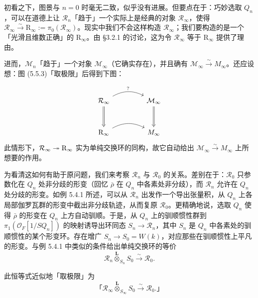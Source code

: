 初看之下，图景与 $n=0$ 时毫无二致，似乎没有进展。但要点在于：巧妙选取 $Q_n$，可以在道德上让 $\mathcal R_n$「趋于」一个实际上是经典的对象 $\mathcal R_\infty$，使得 $\mathcal R_\infty\xrightarrow{\sim}\mathrm R_\infty:=\pi_0(\mathcal R_\infty)$。现实中我们不会这样构造 $\mathcal R_\infty$；我们要构造的是一个「光滑且维数正确」的 $\mathrm R_\infty$。由 §3.2.1 的讨论，这为令 $\mathcal R_\infty$ 等于 $\mathrm R_\infty$ 提供了理由。

进而，$\mathcal M_n$「趋于」一个对象 $\mathcal M_\infty$（它确实存在），并且确有 $\mathcal M_\infty\xrightarrow{\sim}M_\infty$。还应设想：图 (5.5.3)「取极限」后得到下图：


\[
\begin{tikzcd}[column sep=4.5em, row sep=3em]
\mathcal R_\infty \arrow[r, bend left=28, "?"] \arrow[d, Rightarrow] & \mathcal M_\infty \arrow[d, Rightarrow] \\
\mathrm R_\infty \arrow[r, bend left=28] & M_\infty
\end{tikzcd}
\]
此情形下，$\mathcal R_\infty\twoheadrightarrow\mathrm R_\infty$ 实为单纯交换环的同构，故它自动给出 $\mathcal M_\infty\xrightarrow{\sim}M_\infty$ 上所想要的作用。

为看清这如何有助于原问题，我们来考察 $\mathcal R_n$ 与 $\mathcal R_0$ 的关系。差别在于：$\mathcal R_0$ 只参数化在 $Q_n$ 处非分歧的形变（回忆 $\bar\rho$ 在 $Q_n$ 中各素处非分歧），而 $\mathcal R_n$ 允许在 $Q_n$ 处分歧的形变。如例 5.4.1 所述，可以从 $\mathcal R_n$ 出发作一个导出张量积，从 $Q_n$ 上各局部伽罗瓦群的形变中截出非分歧轨迹，从而复原 $\mathcal R_0$。更精确地说，选取 $Q_n$ 使得 $\bar\rho$ 的形变在 $Q_n$ 上方自动驯顺。于是，从 $Q_n$ 上的驯顺惯性群到 $\pi_1(\mathcal O_F[1/SQ_n])$ 的映射诱导出环同态 $S_n\to\mathcal R_n$，其中 $S_n$ 是 $Q_n$ 中各素处的驯顺惯性的某个形变环。存在增广 $S_n\to S_0=W(k)$，对应那些在驯顺惯性上平凡的形变。与例 5.4.1 中类似的条件给出单纯交换环的等价
\begin{equation}\tag{5.5.1}\label{eq:a6-04-1}
\mathcal R_n\overset{\mathbf L}{\otimes}_{S_n}S_0\xrightarrow{\sim}\mathcal R_0.
\end{equation}

此恒等式近似地「取极限」为
\begin{equation}\tag{5.5.2}\label{eq:a6-04-2}
\text{「}\mathcal R_\infty\overset{\mathbf L}{\otimes}_{S_\infty}S_0\xrightarrow{\sim}\mathcal R_0.\text{」}
\end{equation}

